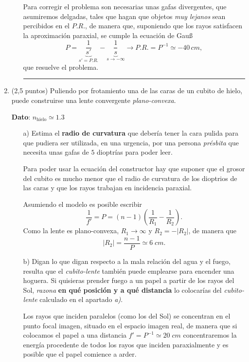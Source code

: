 \documentclass[a4paper,14pt]{extarticle}
\newcommand{\halmos}{
\vspace*{-1ex}

\begin{flushright}
\rule{1mm}{2.5mm} \end{flushright}
\vspace*{-3ex}

}
\renewcommand{\qed}{\halmos}
\begin{document}
\begin{enumerate}
\begin{itemize}
\begin{mdframed}[backgroundcolor=brown!10]
			Para corregir el problema son necesarias unas gafas divergentes, que asumiremos delgadas, tales que hagan que objetos \textit{muy lejanos} sean percibidos en el $P.R.$, de manera que, suponiendo que los rayos satisfacen la aproximación paraxial, se cumple la ecuación de Gau\ss
			$$P=\underbrace{\frac{1}{s'}}_{s'=P.R.}-\underbrace{\frac{1}{s}}_{s\to-\infty}\rightarrow \boxed{P.R.=P^{-1}\simeq -40\,cm,}$$
			que resuelve el problema.
			\end{mdframed}
			\qed
		\end{itemize}				

    \newpage
    
    \item (2,5 puntos)  Puliendo  por  frotamiento  una  de  las  caras  de  un  cubito  de  hielo,  puede construirse una lente convergente \textit{plano-convexa}.
    \vspace{1ex}
    
    \textbf{Dato}: $n_{\text{hielo}}\simeq 1.3$
		\begin{itemize}
			\item[a)] Estima el  \textbf{radio  de  curvatura}  que debería tener la  cara  pulida para que pudiera ser utilizada, en una urgencia, por una persona \textit{présbita} que necesita unas gafas de $5$ dioptrías para poder leer.
			\begin{mdframed}[backgroundcolor=brown!10]
			Para poder usar la ecuación del constructor hay que suponer que el grosor del cubito es mucho menor que el radio de curvatura de los dioptrios de las caras y que los rayos trabajan en incidencia paraxial. 
			
			Asumiendo el modelo es posible escribir
			$$\frac{1}{f'}=P=(n-1)\left(\frac{1}{R_1}-\frac{1}{R_2}\right).$$
			Como la lente es plano-convexa, $R_1\to\infty$ y $R_2=-\lvert R_2\rvert$, de manera que 
			$$\boxed{\lvert R_2\rvert=\frac{n-1}{P}\simeq 6\;cm.}$$
			\end{mdframed}
			\item[b)]  Digan lo que digan respecto a la mala relación del agua y el fuego, resulta que el \textit{cubito-lente}  también puede emplearse   para   encender una hoguera. Si quisieras prender fuego a un papel a partir de los rayos del Sol, \textit{razona} \textbf{en qué posición y a qué distancia} lo colocarías del \textit{cubito-lente} calculado en el apartado \textit{a)}.
			\begin{mdframed}[backgroundcolor=brown!10]
			Los rayos que inciden paralelos (como los del Sol) se concentran en el punto focal imagen, situado en el espacio imagen real, de manera que si colocamos el papel a una distancia $f'=P^{-1}\simeq 20\;cm$ concentraremos la energía procedente de todos los rayos que inciden paraxialmente y es posible que el papel comience a arder.
		\end{mdframed}	
			\end{itemize}
				

\end{enumerate}
\end{document}
